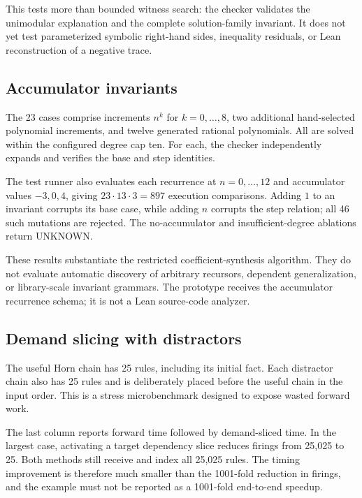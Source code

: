 \documentclass[11pt,a4paper]{article}
\newcommand{\unknown}{\textnormal{UNKNOWN}}
\begin{document}
This tests more than bounded witness search: the checker validates the unimodular explanation and the complete solution-family invariant. It does not yet test parameterized symbolic right-hand sides, inequality residuals, or Lean reconstruction of a negative trace.

\subsection{Accumulator invariants}

The 23 cases comprise increments $n^k$ for $k=0,\ldots,8$, two additional hand-selected polynomial increments, and twelve generated rational polynomials. All are solved within the configured degree cap ten. For each, the checker independently expands and verifies the base and step identities.

The test runner also evaluates each recurrence at $n=0,\ldots,12$ and accumulator values $-3,0,4$, giving $23\cdot13\cdot3=897$ execution comparisons. Adding $1$ to an invariant corrupts its base case, while adding $n$ corrupts the step relation; all 46 such mutations are rejected. The no-accumulator and insufficient-degree ablations return \unknown.

These results substantiate the restricted coefficient-synthesis algorithm. They do not evaluate automatic discovery of arbitrary recursors, dependent generalization, or library-scale invariant grammars. The prototype receives the accumulator recurrence schema; it is not a Lean source-code analyzer.

\subsection{Demand slicing with distractors}

The useful Horn chain has 25 rules, including its initial fact. Each distractor chain also has 25 rules and is deliberately placed before the useful chain in the input order. This is a stress microbenchmark designed to expose wasted forward work.

\begin{center}
\small

\end{center}

The last column reports forward time followed by demand-sliced time. In the largest case, activating a target dependency slice reduces firings from 25,025 to 25. Both methods still receive and index all 25,025 rules. The timing improvement is therefore much smaller than the 1001-fold reduction in firings, and the example must not be reported as a 1001-fold end-to-end speedup.
\end{document}

